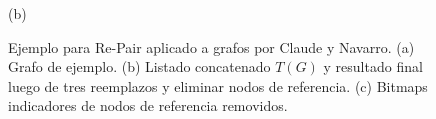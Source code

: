 \begin{figure}
\begin{minipage}{1\textwidth}
		(b)
    	\end{minipage}

    \caption{Ejemplo para Re-Pair aplicado a grafos por Claude y Navarro. (a) Grafo de ejemplo. (b) Listado concatenado $T(G)$ y resultado final luego de tres reemplazos y eliminar nodos de referencia. (c) Bitmaps indicadores de nodos de referencia removidos.}
    \label{fig:repairCN}
\end{figure}
